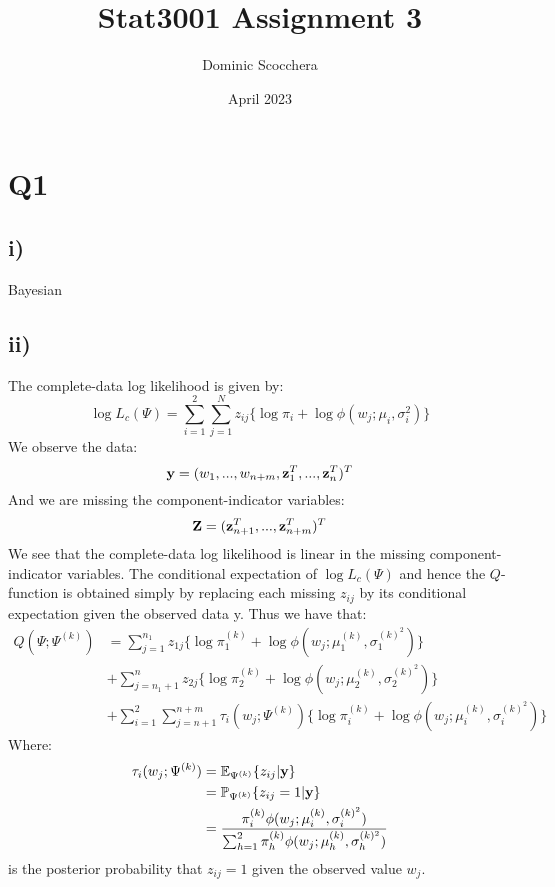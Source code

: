 \documentclass{article}
\title{Stat3001 Assignment 3}
\author{Dominic Scocchera}
\date{April 2023}
\begin{document}
\maketitle
\section*{Q1}
\subsection*{i)}
Bayesian
\subsection*{ii)}
The complete-data log likelihood is given by:
$$\log L_c(\Psi)=\sum_{i=1}^{2}\sum_{j=1}^{N}z_{ij}\{\log\pi_i+\log\phi(w_j;\mu_i,\sigma_i^2)\}$$
We observe the data:
$$\bold{y}=(w_1,...,w_{n+m},\bold{z}_1^T,...,\bold{z}_n^T)^T$$
And we are missing the component-indicator variables:
$$\bold{Z}=(\bold{z}_{n+1}^T,...,\bold{z}_{n+m}^T)^T$$
We see that the complete-data log likelihood is linear in the missing component-indicator variables. The conditional expectation of $\log L_c(\Psi)$ and hence the $Q$-function is obtained simply by replacing
each missing $z_{ij}$ by its conditional expectation given the observed data y. Thus we have that:
\begin{align*}
Q(\Psi;\Psi^{(k)})&=\sum_{j=1}^{n_1}z_{1j}\{\log\pi_1^{(k)}+\log\phi(w_j;\mu_1^{(k)},\sigma_1^{(k)^2})\}\\
&+\sum_{j=n_1+1}^{n}z_{2j}\{\log\pi_2^{(k)}+\log\phi(w_j;\mu_2^{(k)},\sigma_2^{(k)^2})\}\\
&+\sum_{i=1}^{2}\sum_{j=n+1}^{n+m}\tau_i(w_j;\Psi^{(k)})\{\log\pi_i^{(k)}+\log\phi(w_j;\mu_i^{(k)},\sigma_i^{(k)^2})\}
\end{align*}
Where:
\begin{align*}
\tau_{i}(w_j;\Psi^{(k)})&=\mathbb{E}_{\Psi^{(k)}}\{z_{ij}|\bold{y}\}\\
&=\mathbb{P}_{\Psi^{(k)}}\{z_{ij}=1|\bold{y}\}\\
&=\frac{\pi_i^{(k)}\phi(w_j;\mu_i^{(k)},\sigma_i^{(k)^2})}{\sum_{h=1}^2\pi_h^{(k)}\phi(w_j;\mu_h^{(k)},\sigma_h^{(k)^2})}\\
\end{align*}
is the posterior probability that $z_{ij} = 1$ given the observed value $w_j$.
\end{document}
